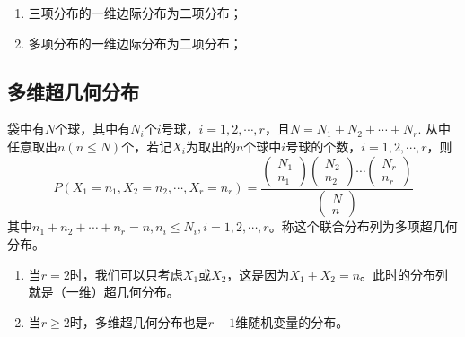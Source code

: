  \begin{remark}
     \begin{enumerate}
         \item 三项分布的一维边际分布为二项分布；
         \item 多项分布的一维边际分布为二项分布；
     \end{enumerate}
 \end{remark}
\subsection{多维超几何分布}
\begin{definition}
    袋中有$N$个球，其中有$N_i$个$i$号球，$i=1,2,\cdots,r$，且$N = N_1+N_2 + \cdots + N_r$. 从中任意取出$n(n\leq N)$个，若记$X_i$为取出的$n$个球中$i$号球的个数，$i=1,2,\cdots,r$，则
    $$
    P(X_1=n_1,X_2=n_2,\cdots,X_r= n_r) = \frac{\begin{pmatrix}
        N_1\\n_1
    \end{pmatrix}\begin{pmatrix}
        N_2\\n_2
    \end{pmatrix}\cdots\begin{pmatrix}
        N_r\\n_r
    \end{pmatrix}}{\begin{pmatrix}
        N\\n
    \end{pmatrix}}
    $$
    其中$n_1+n_2+\cdots+n_r = n,n_i\leq N_i,i=1,2,\cdots,r$。称这个联合分布列为多项超几何分布。
\end{definition}
\begin{remark}
\begin{enumerate}
    \item 当$r=2$时，我们可以只考虑$X_1$或$X_2$，这是因为$X_1+X_2=n$。此时的分布列就是（一维）超几何分布。
    \item 当$r\geq 2$时，多维超几何分布也是$r-1$维随机变量的分布。
\end{enumerate}    
\end{remark}
